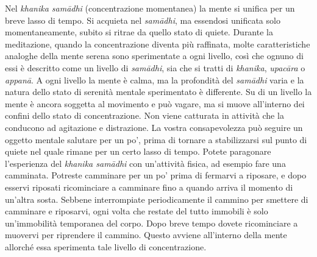 Nel \emph{khanika samādhi} (concentrazione momentanea) la mente si
unifica per un breve lasso di tempo. Si acquieta nel \emph{samādhi}, ma
essendosi unificata solo momentaneamente, subito si ritrae da quello
stato di quiete. Durante la meditazione, quando la concentrazione
diventa più raffinata, molte caratteristiche analoghe della mente serena
sono sperimentate a ogni livello, così che ognuno di essi è descritto
come un livello di \emph{samādhi}, sia che si tratti di \emph{khanika},
\emph{upacāra} o \emph{appanā}. A ogni livello la mente è calma, ma la
profondità del \emph{samādhi} varia e la natura dello stato di serenità
mentale sperimentato è differente. Su di un livello la mente è ancora
soggetta al movimento e può vagare, ma si muove all'interno dei confini
dello stato di concentrazione. Non viene catturata in attività che la
conducono ad agitazione e distrazione. La vostra consapevolezza può
seguire un oggetto mentale salutare per un po', prima di tornare a
stabilizzarsi sul punto di quiete nel quale rimane per un certo lasso di
tempo. Potete paragonare l'esperienza del \emph{khanika samādhi} con
un'attività fisica, ad esempio fare una camminata. Potreste camminare
per un po' prima di fermarvi a riposare, e dopo esservi riposati
ricominciare a camminare fino a quando arriva il momento di un'altra
sosta. Sebbene interrompiate periodicamente il cammino per smettere di
camminare e riposarvi, ogni volta che restate del tutto immobili è solo
un'immobilità temporanea del corpo. Dopo breve tempo dovete ricominciare
a muovervi per riprendere il cammino. Questo avviene all'interno della
mente allorché essa sperimenta tale livello di concentrazione.

